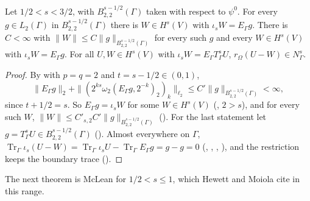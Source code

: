 \begin{lemma}
\label{lem:boundary-extension-sobolev}
\leanok
{}
Let $1/2 < s < 3/2$, with $B^{s-1/2}_{2,2}(\Gamma)$ taken with respect to $\psi^0$. For every
$g \in L_2(\Gamma)$ in $B^{s-1/2}_{2,2}(\Gamma)$ there is $W \in H^s(V)$ with
$\iota_s W = E_\Gamma g$. There is $C < \infty$ with $\|W\| \leq C
\|g\|_{B^{s-1/2}_{2,2}(\Gamma)}$ for every such $g$ and every $W \in H^s(V)$ with
$\iota_s W = E_\Gamma g$. For all $U, W \in H^s(V)$ with $\iota_s W = E_\Gamma T^s_\Gamma U$,
$r_\Omega(U - W) \in N^s_\Gamma$.
\end{lemma}

\begin{proof}
\leanok
By  with $p = q = 2$ and $t = s - 1/2 \in (0, 1)$,
\[
  \|E_\Gamma g\|_2 + \|(2^{ks} \omega_2(E_\Gamma g, 2^{-k})_2)_k\|_{\ell_2}
  \leq C' \|g\|_{B^{s-1/2}_{2,2}(\Gamma)} < \infty ,
\]
since $t + 1/2 = s$. So $E_\Gamma g = \iota_s W$ for some $W \in H^s(V)$
(, $2 > s$), and for every such $W$,
$\|W\| \leq C'_{s,2} C' \|g\|_{B^{s-1/2}_{2,2}(\Gamma)}$ ().
For the last statement let $g = T^s_\Gamma U \in B^{s-1/2}_{2,2}(\Gamma)$
(). Almost everywhere on $\Gamma$,
$\operatorname{Tr}_\Gamma \iota_s (U - W) = \operatorname{Tr}_\Gamma \iota_s U -
\operatorname{Tr}_\Gamma E_\Gamma g = g - g = 0$ (,
, ,
), and the restriction keeps the boundary trace
().
\end{proof}

The next theorem is McLean \cite[Theorem 3.40]{McLean} for $1/2 < s \leq 1$, which Hewett and
Moiola \cite[Remark 2.6]{HewettMoiola} cite in this range.

